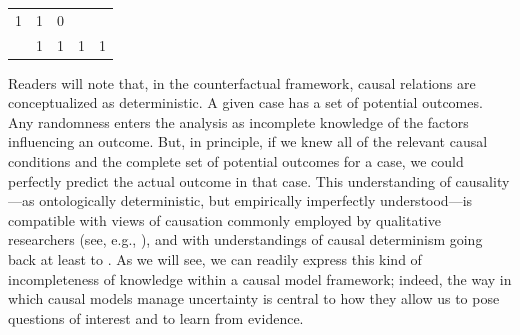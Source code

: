 \documentclass[12pt,]{book}
\begin{document}
\begin{longtable}[]{@{}cllll@{}}
\begin{minipage}[t]{0.18\columnwidth}
1\strut
\end{minipage} & \begin{minipage}[t]{0.19\columnwidth}\raggedright
1\strut
\end{minipage} & \begin{minipage}[t]{0.16\columnwidth}\raggedright
0\strut
\end{minipage}\tabularnewline
\begin{minipage}[t]{0.15\columnwidth}\centering
16\strut
\end{minipage} & \begin{minipage}[t]{0.17\columnwidth}\raggedright
1\strut
\end{minipage} & \begin{minipage}[t]{0.18\columnwidth}\raggedright
1\strut
\end{minipage} & \begin{minipage}[t]{0.19\columnwidth}\raggedright
1\strut
\end{minipage} & \begin{minipage}[t]{0.16\columnwidth}\raggedright
1\strut
\end{minipage}\tabularnewline
\bottomrule
\end{longtable}

Readers will note that, in the counterfactual framework, causal relations are conceptualized as deterministic. A given case has a set of potential outcomes. Any randomness enters the analysis as incomplete knowledge of the factors influencing an outcome. But, in principle, if we knew all of the relevant causal conditions and the complete set of potential outcomes for a case, we could perfectly predict the actual outcome in that case. This understanding of causality---as ontologically deterministic, but empirically imperfectly understood---is compatible with views of causation commonly employed by qualitative researchers (see, e.g., \citet{mahoney2008toward}), and with understandings of causal determinism going back at least to \citet{laplace1901philosophical}. As we will see, we can readily express this kind of incompleteness of knowledge within a causal model framework; indeed, the way in which causal models manage uncertainty is central to how they allow us to pose questions of interest and to learn from evidence.
\end{document}
